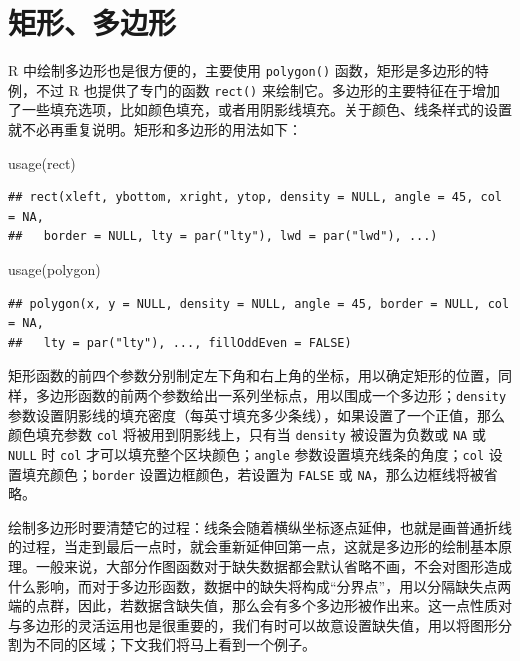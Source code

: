 \documentclass[
  b5paper,
  UTF8,twoside]{book}
\newenvironment{Shaded}{\begin{snugshade}}{\end{snugshade}}
\newcommand{\FunctionTok}[1]{\textcolor[rgb]{0.00,0.00,0.00}{#1}}
\newcommand{\NormalTok}[1]{#1}
\begin{document}
\hypertarget{sec:polygon}{%
\section{矩形、多边形}\label{sec:polygon}}

R 中绘制多边形也是很方便的，主要使用 \texttt{polygon()} 函数，矩形是多边形的特例，不过 R 也提供了专门的函数 \texttt{rect()} 来绘制它。多边形的主要特征在于增加了一些填充选项，比如颜色填充，或者用阴影线填充。关于颜色、线条样式的设置就不必再重复说明。矩形和多边形的用法如下：

\begin{Shaded}
\begin{Highlighting}[]
\FunctionTok{usage}\NormalTok{(rect)}
\end{Highlighting}
\end{Shaded}

\begin{verbatim}
## rect(xleft, ybottom, xright, ytop, density = NULL, angle = 45, col = NA,
##   border = NULL, lty = par("lty"), lwd = par("lwd"), ...)
\end{verbatim}

\begin{Shaded}
\begin{Highlighting}[]
\FunctionTok{usage}\NormalTok{(polygon)}
\end{Highlighting}
\end{Shaded}

\begin{verbatim}
## polygon(x, y = NULL, density = NULL, angle = 45, border = NULL, col = NA,
##   lty = par("lty"), ..., fillOddEven = FALSE)
\end{verbatim}

矩形函数的前四个参数分别制定左下角和右上角的坐标，用以确定矩形的位置，同样，多边形函数的前两个参数给出一系列坐标点，用以围成一个多边形；\texttt{density} 参数设置阴影线的填充密度（每英寸填充多少条线），如果设置了一个正值，那么颜色填充参数 \texttt{col} 将被用到阴影线上，只有当 \texttt{density} 被设置为负数或 \texttt{NA} 或 \texttt{NULL} 时 \texttt{col} 才可以填充整个区块颜色；\texttt{angle} 参数设置填充线条的角度；\texttt{col} 设置填充颜色；\texttt{border} 设置边框颜色，若设置为 \texttt{FALSE} 或 \texttt{NA}，那么边框线将被省略。

绘制多边形时要清楚它的过程：线条会随着横纵坐标逐点延伸，也就是画普通折线的过程，当走到最后一点时，就会重新延伸回第一点，这就是多边形的绘制基本原理。一般来说，大部分作图函数对于缺失数据都会默认省略不画，不会对图形造成什么影响，而对于多边形函数，数据中的缺失将构成``分界点''，用以分隔缺失点两端的点群，因此，若数据含缺失值，那么会有多个多边形被作出来。这一点性质对与多边形的灵活运用也是很重要的，我们有时可以故意设置缺失值，用以将图形分割为不同的区域；下文我们将马上看到一个例子。
\end{document}
